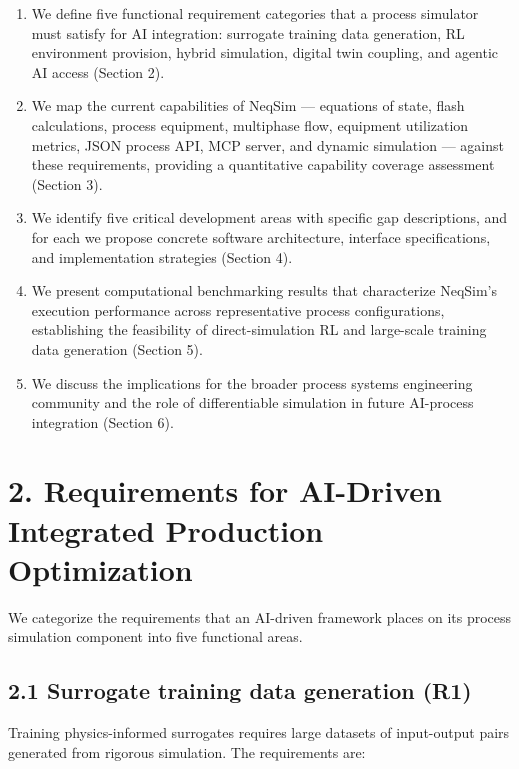 \documentclass[review,3p]{custom}
\begin{document}
\begin{enumerate}
  \item We define five functional requirement categories that a process simulator must satisfy for AI integration: surrogate training data generation, RL environment provision, hybrid simulation, digital twin coupling, and agentic AI access (Section 2).

  \item We map the current capabilities of NeqSim --- equations of state, flash calculations, process equipment, multiphase flow, equipment utilization metrics, JSON process API, MCP server, and dynamic simulation --- against these requirements, providing a quantitative capability coverage assessment (Section 3).

  \item We identify five critical development areas with specific gap descriptions, and for each we propose concrete software architecture, interface specifications, and implementation strategies (Section 4).

  \item We present computational benchmarking results that characterize NeqSim's execution performance across representative process configurations, establishing the feasibility of direct-simulation RL and large-scale training data generation (Section 5).

  \item We discuss the implications for the broader process systems engineering community and the role of differentiable simulation in future AI-process integration (Section 6).
\end{enumerate}


\section{2. Requirements for AI-Driven Integrated Production Optimization}

We categorize the requirements that an AI-driven framework places on its process simulation component into five functional areas.

\subsection{2.1 Surrogate training data generation (R1)}

Training physics-informed surrogates requires large datasets of input-output pairs generated from rigorous simulation. The requirements are:
\end{document}
